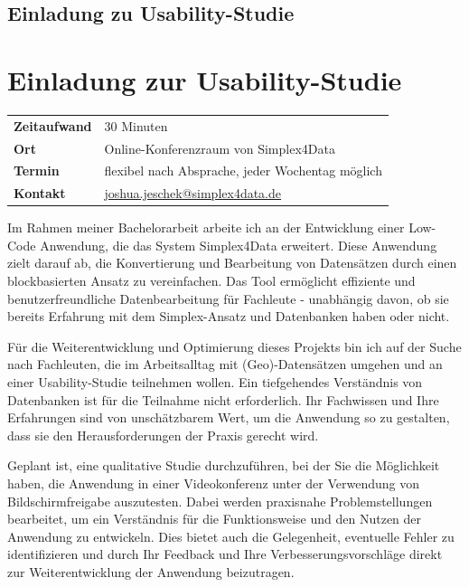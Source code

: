 \ifdefined\STANDALONE
  \section*{Einladung zu Usability-Studie}
\else
  \chapter{Einladung zur Usability-Studie}
\fi

\begin{tabular}{ l l }
  \textbf{Zeitaufwand} & 30 Minuten                                                                   \\
  \textbf{Ort}         & Online-Konferenzraum von Simplex4Data                                        \\
  \textbf{Termin}      & flexibel nach Absprache, jeder Wochentag möglich                             \\
  \textbf{Kontakt}     & \href{mailto:joshua.jeschek@simplex4data.de}{joshua.jeschek@simplex4data.de}
\end{tabular}

\vspace{2\baselineskip}

\noindent
Im Rahmen meiner Bachelorarbeit arbeite ich an der Entwicklung einer Low-Code Anwendung, die das
System Simplex4Data erweitert. Diese Anwendung zielt darauf ab, die Konvertierung und Bearbeitung
von Datensätzen durch einen blockbasierten Ansatz zu vereinfachen. Das Tool ermöglicht effiziente
und benutzerfreundliche Datenbearbeitung für Fachleute - unabhängig davon, ob sie bereits Erfahrung
mit dem Simplex-Ansatz und Datenbanken haben oder nicht.

Für die Weiterentwicklung und Optimierung dieses Projekts bin ich auf der Suche nach Fachleuten, die
im Arbeitsalltag mit (Geo)-Datensätzen umgehen und an einer Usability-Studie teilnehmen wollen. Ein
tiefgehendes Verständnis von Datenbanken ist für die Teilnahme nicht erforderlich. Ihr Fachwissen
und Ihre Erfahrungen sind von unschätzbarem Wert, um die Anwendung so zu gestalten, dass sie den
Herausforderungen der Praxis gerecht wird.

Geplant ist, eine qualitative Studie durchzuführen, bei der Sie die Möglichkeit haben, die Anwendung
in einer Videokonferenz unter der Verwendung von Bildschirmfreigabe auszutesten. Dabei werden
praxisnahe Problemstellungen bearbeitet, um ein Verständnis für die Funktionsweise und den Nutzen
der Anwendung zu entwickeln. Dies bietet auch die Gelegenheit, eventuelle Fehler zu identifizieren
und durch Ihr Feedback und Ihre Verbesserungsvorschläge direkt zur Weiterentwicklung der Anwendung
beizutragen.


